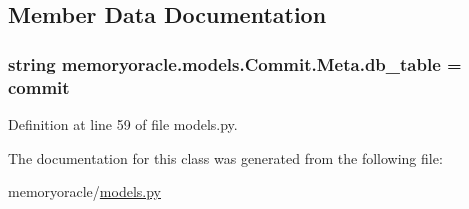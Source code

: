 \subsection{Member Data Documentation}
\hypertarget{classmemoryoracle_1_1models_1_1Commit_1_1Meta_a45bf44b735f44732d07f38178af439b3}{}
\subsubsection[{db\+\_\+table}]{\setlength{\rightskip}{0pt plus 5cm}string memoryoracle.\+models.\+Commit.\+Meta.\+db\+\_\+table = \textquotesingle{}commit\textquotesingle{}\hspace{0.3cm}{\ttfamily [static]}}\label{classmemoryoracle_1_1models_1_1Commit_1_1Meta_a45bf44b735f44732d07f38178af439b3}


Definition at line 59 of file models.\+py.



The documentation for this class was generated from the following file\+:\begin{DoxyCompactItemize}
\item 
memoryoracle/\hyperlink{models_8py}{models.\+py}\end{DoxyCompactItemize}
